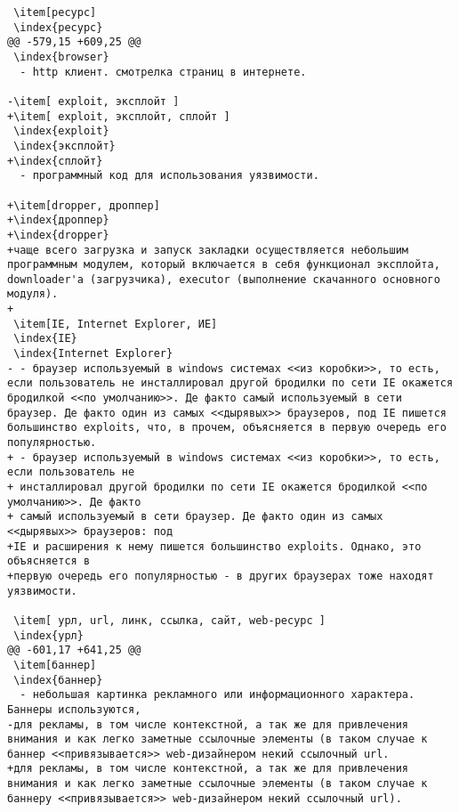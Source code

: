 \begin{verbatim}
 \item[ресурс]
 \index{ресурс}
@@ -579,15 +609,25 @@
 \index{browser}
  - http клиент. смотрелка страниц в интернете.

-\item[ exploit, эксплойт ]
+\item[ exploit, эксплойт, сплойт ]
 \index{exploit}
 \index{эксплойт}
+\index{сплойт}
  - программный код для использования уязвимости.

+\item[dropper, дроппер]
+\index{дроппер}
+\index{dropper}
+чаще всего загрузка и запуск закладки осуществляется небольшим программным модулем, который включается в себя функционал эксплойта, downloader'а (загрузчика), executor (выполнение скачанного основного модуля).
+
 \item[IE, Internet Explorer, ИЕ]
 \index{IE}
 \index{Internet Explorer}
- - браузер используемый в windows системах <<из коробки>>, то есть, если пользователь не инсталлировал другой бродилки по сети IE окажется бродилкой <<по умолчанию>>. Де факто самый используемый в сети браузер. Де факто один из самых <<дырявых>> браузеров, под IE пишется большинство exploits, что, в прочем, объясняется в первую очередь его популярностью.
+ - браузер используемый в windows системах <<из коробки>>, то есть, если пользователь не
+ инсталлировал другой бродилки по сети IE окажется бродилкой <<по умолчанию>>. Де факто
+ самый используемый в сети браузер. Де факто один из самых <<дырявых>> браузеров: под
+IE и расширения к нему пишется большинство exploits. Однако, это объясняется в
+первую очередь его популярностью - в других браузерах тоже находят уязвимости.

 \item[ урл, url, линк, ссылка, сайт, web-ресурс ]
 \index{урл}
@@ -601,17 +641,25 @@
 \item[баннер]
 \index{баннер}
  - небольшая картинка рекламного или информационного характера. Баннеры используются,
-для рекламы, в том числе контекстной, а так же для привлечения внимания и как легко заметные ссылочные элементы (в таком случае к баннер <<привязывается>> web-дизайнером некий ссылочный url.
+для рекламы, в том числе контекстной, а так же для привлечения внимания и как легко заметные ссылочные элементы (в таком случае к баннеру <<привязывается>> web-дизайнером некий ссылочный url).


\end{verbatim}
